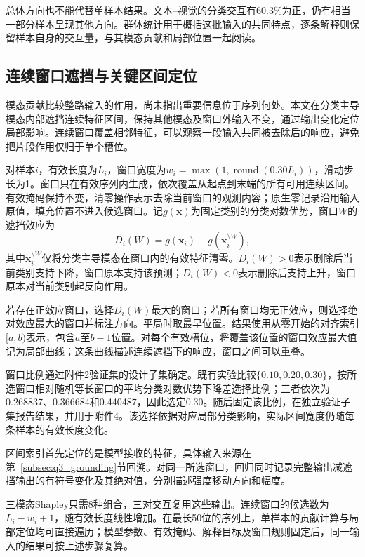 \QThreeParagraph 总体方向也不能代替单样本结果。文本--视觉的分类交互有60.3\%为正，仍有相当一部分样本呈现其他方向。群体统计用于概括这批输入的共同特点，逐条解释则保留样本自身的交互量，与其模态贡献和局部位置一起阅读。

\subsection{连续窗口遮挡与关键区间定位}\label{subsec:q3_temporal}
\QThreeParagraph 模态贡献比较整路输入的作用，尚未指出重要信息位于序列何处。本文在分类主导模态内部遮挡连续特征区间，保持其他模态及窗口外输入不变，通过输出变化定位局部影响。连续窗口覆盖相邻特征，可以观察一段输入共同被去除后的响应，避免把片段作用仅归于单个槽位。

\QThreeParagraph 对样本$i$，有效长度为$L_i$，窗口宽度为$w_i=\max(1,\operatorname{round}(0.30L_i))$，滑动步长为1。窗口只在有效序列内生成，依次覆盖从起点到末端的所有可用连续区间。有效掩码保持不变，清零操作表示去除当前窗口的观测内容；原生零记录沿用输入原值，填充位置不进入候选窗口。记$g(\mathbf x)$为固定类别的分类对数优势，窗口$W$的遮挡效应为
\begin{equation}
D_i(W)=g(\mathbf x_i)-g\!\left(\mathbf x_i^{\setminus W}\right),
\label{eq:q3_occlusion}
\end{equation}
\QThreeParagraph 其中$\mathbf x_i^{\setminus W}$仅将分类主导模态在窗口内的有效特征清零。$D_i(W)>0$表示删除后当前类别支持下降，窗口原本支持该预测；$D_i(W)<0$表示删除后支持上升，窗口原本对当前类别起反向作用。

\QThreeParagraph 若存在正效应窗口，选择$D_i(W)$最大的窗口；若所有窗口均无正效应，则选择绝对效应最大的窗口并标注方向。平局时取最早位置。结果使用从零开始的对齐索引$[a,b)$表示，包含$a$至$b-1$位置。对每个有效槽位，将覆盖该位置的窗口效应最大值记为局部曲线；这条曲线描述连续遮挡下的响应，窗口之间可以重叠。

\QThreeParagraph 窗口比例通过附件2验证集的设计子集确定。既有实验比较$\{0.10,0.20,0.30\}$，按所选窗口相对随机等长窗口的平均分类对数优势下降差选择比例；三者依次为0.268837、0.366684和0.440487，因此选定0.30。随后固定该比例，在独立验证子集报告结果，并用于附件4。该选择依据对应局部分类影响，实际区间宽度仍随每条样本的有效长度变化。

\QThreeParagraph 区间索引首先定位的是模型接收的特征，具体输入来源在第~\ref{subsec:q3_grounding}节回溯。对同一所选窗口，回归同时记录完整输出减遮挡输出的有符号变化及其绝对值，分别描述强度移动方向和幅度。

\QThreeParagraph 三模态Shapley只需8种组合，三对交互复用这些输出。连续窗口的候选数为$L_i-w_i+1$，随有效长度线性增加。在最长50位的序列上，单样本的贡献计算与局部定位均可直接遍历；模型参数、有效掩码、解释目标及窗口规则固定后，同一输入的结果可按上述步骤复算。

